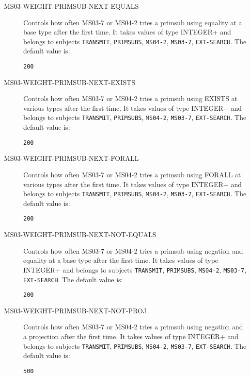 \begin{description}
\item[MS03-WEIGHT-PRIMSUB-NEXT-EQUALS]  
Controls how often MS03-7 or MS04-2 tries a primsub using equality at a base
type after the first time.
It takes values of type INTEGER+ and belongs to subjects \texttt{TRANSMIT}, \texttt{PRIMSUBS}, \texttt{MS04-2}, \texttt{MS03-7}, \texttt{EXT-SEARCH}.  The default value is: \begin{lstlisting}
200
\end{lstlisting}

\item[MS03-WEIGHT-PRIMSUB-NEXT-EXISTS]  
Controls how often MS03-7 or MS04-2 tries a primsub using EXISTS at various
types after the first time.
It takes values of type INTEGER+ and belongs to subjects \texttt{TRANSMIT}, \texttt{PRIMSUBS}, \texttt{MS04-2}, \texttt{MS03-7}, \texttt{EXT-SEARCH}.  The default value is: \begin{lstlisting}
200
\end{lstlisting}

\item[MS03-WEIGHT-PRIMSUB-NEXT-FORALL]  
Controls how often MS03-7 or MS04-2 tries a primsub using FORALL at various
types after the first time.
It takes values of type INTEGER+ and belongs to subjects \texttt{TRANSMIT}, \texttt{PRIMSUBS}, \texttt{MS04-2}, \texttt{MS03-7}, \texttt{EXT-SEARCH}.  The default value is: \begin{lstlisting}
200
\end{lstlisting}

\item[MS03-WEIGHT-PRIMSUB-NEXT-NOT-EQUALS]  
Controls how often MS03-7 or MS04-2 tries a primsub using negation and equality
at a base type after the first time.
It takes values of type INTEGER+ and belongs to subjects \texttt{TRANSMIT}, \texttt{PRIMSUBS}, \texttt{MS04-2}, \texttt{MS03-7}, \texttt{EXT-SEARCH}.  The default value is: \begin{lstlisting}
200
\end{lstlisting}

\item[MS03-WEIGHT-PRIMSUB-NEXT-NOT-PROJ]  
Controls how often MS03-7 or MS04-2 tries a primsub using negation and a
projection after the first time.
It takes values of type INTEGER+ and belongs to subjects \texttt{TRANSMIT}, \texttt{PRIMSUBS}, \texttt{MS04-2}, \texttt{MS03-7}, \texttt{EXT-SEARCH}.  The default value is: \begin{lstlisting}
500
\end{lstlisting}


\end{description}
